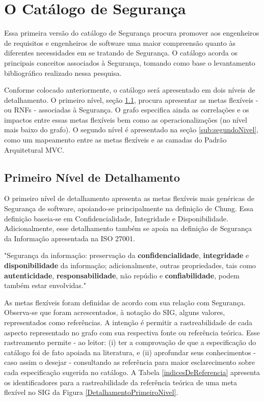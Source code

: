 \section{O Catálogo de Segurança}

Essa primeira versão do catálogo de Segurança procura promover aos engenheiros de requisitos e engenheiros de software uma maior compreensão quanto às diferentes necessidades em se tratando de Segurança. O catálogo acorda os principais conceitos associados à Segurança, tomando como base o levantamento bibliográfico realizado nessa pesquisa.

Conforme colocado anteriormente, o catálogo será apresentado em dois níveis de detalhamento. O primeiro nível, seção \ref{sub:primeiroNivel}, procura apresentar as metas flexíveis - ou RNFs - associadas à Segurança. O grafo especifica ainda as correlações e os impactos entre essas metas flexíveis bem como as operacionalizações (no nível mais baixo do grafo). O segundo nível é apresentado na seção \ref{sub:segundoNivel}, como um mapeamento entre as metas flexíveis e as camadas do Padrão Arquitetural MVC.

\subsection{Primeiro Nível de Detalhamento}
\label{sub:primeiroNivel}

O primeiro nível de detalhamento apresenta as metas flexíveis mais genéricas de Segurança de software, apoiando-se principalmente na definição de Chung. Essa definição baseia-se em Confidencialidade, Integridade e Disponibilidade. Adicionalmente, esse detalhamento também se apoia na definição de Segurança da Informação apresentada na ISO 27001. 

\begin{citacao}
	"Segurança da informação: preservação da \textbf{confidencialidade}, \textbf{integridade} e \textbf{disponibilidade} da informação; adicionalmente, outras propriedades, tais como \textbf{autenticidade}, \textbf{responsabilidade}, não repúdio e \textbf{confiabilidade}, podem também estar envolvidas." \cite[p. 2]{documentation2005information}
\end{citacao}


As metas flexíveis foram definidas de acordo com sua relação com Segurança. Observa-se que foram acrescentados, à notação do SIG, alguns valores, representados como referências. A intenção é permitir a rastreabilidade de cada aspecto representado no grafo com sua respectiva fonte ou referência teórica. Esse rastreamento permite - ao leitor: (i) ter a comprovação de que a especificação do catálogo foi de fato apoiada na literatura, e (ii) aprofundar seus conhecimentos - caso assim o desejar - consultando as referência para maior esclarecimento sobre cada especificação sugerida no catálogo. A Tabela \ref{indicesDeReferencia} apresenta os identificadores para a rastreabilidade da referência teórica de uma meta flexível no SIG da Figura \ref{DetalhamentoPrimeiroNivel}. 

